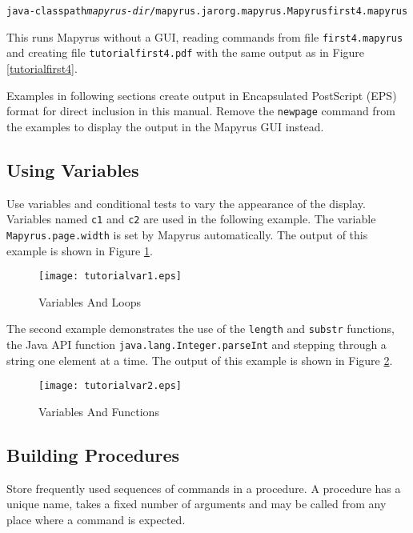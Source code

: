\begin{alltt}
java -classpath \textit{mapyrus-dir}/mapyrus.jar org.mapyrus.Mapyrus first4.mapyrus
\end{alltt}

This runs Mapyrus without a GUI, reading commands from file
\texttt{first4.mapyrus} and creating file \texttt{tutorialfirst4.pdf}
with the same output as in Figure \ref{tutorialfirst4}.

Examples in following sections create output in Encapsulated
PostScript (EPS) format for direct inclusion in this manual.
Remove the \texttt{newpage} command from the examples
to display the output in the Mapyrus GUI instead.

\subsection{Using Variables}

Use variables and conditional tests to vary the appearance
of the display.
Variables named \texttt{c1} and \texttt{c2} are used in the
following example.  The variable
\texttt{Mapyrus.page.width}
is set by Mapyrus automatically.
The output of this example is shown in Figure \ref{tutorialvar1}.



\begin{figure}[htb]
\texttt{[image: tutorialvar1.eps]}
\caption{Variables And Loops}
\label{tutorialvar1}
\end{figure}

The second example demonstrates the use of the
\texttt{length} and \texttt{substr}
functions,
the Java API function
\texttt{java.lang.Integer.parseInt}
and stepping through a string one element at a time.
The output of this example is shown in Figure \ref{tutorialvar2}.



\begin{figure}[htb]
\texttt{[image: tutorialvar2.eps]}
\caption{Variables And Functions}
\label{tutorialvar2}
\end{figure}


\subsection{Building Procedures}

Store frequently used sequences of commands in a procedure.
A procedure has a unique name, takes a fixed number of arguments and
may be called from any place where a command is expected.


